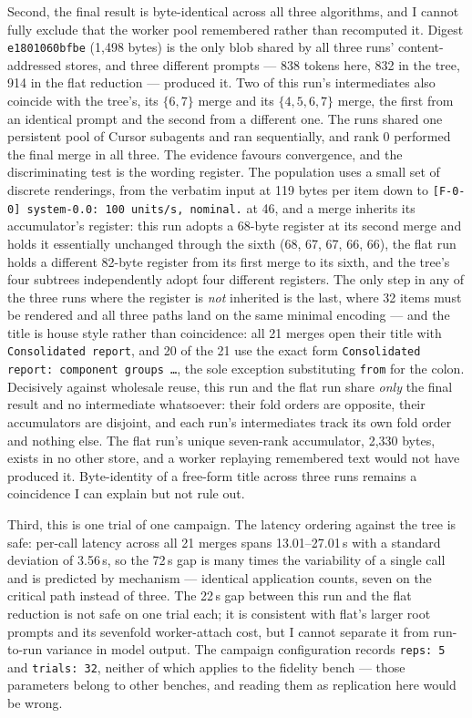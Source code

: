 \documentclass[11pt]{article}
\begin{document}
Second, the final result is byte-identical across all three algorithms, and I cannot
fully exclude that the worker pool remembered rather than recomputed it. Digest
\texttt{e1801060bfbe} (1{,}498 bytes) is the only blob shared by all three runs'
content-addressed stores, and three different prompts --- 838 tokens here, 832 in the
tree, 914 in the flat reduction --- produced it. Two of this run's intermediates also
coincide with the tree's, its $\{6,7\}$ merge and its $\{4,5,6,7\}$ merge, the first
from an identical prompt and the second from a different one. The runs shared one
persistent pool of Cursor subagents and ran sequentially, and rank 0 performed the final
merge in all three. The evidence favours convergence, and the discriminating test is the
wording register. The population uses a small set of discrete renderings, from the
verbatim input at 119 bytes per item down to \texttt{[F-0-0] system-0.0: 100 units/s,
nominal.} at 46, and a merge inherits its accumulator's register: this run adopts a
68-byte register at its second merge and holds it essentially unchanged through the
sixth (68, 67, 67, 66, 66), the flat run holds a different 82-byte register from its
first merge to its sixth, and the tree's four subtrees independently adopt four
different registers. The only step in any of the three runs where the register is
\emph{not} inherited is the last, where 32 items must be rendered and all three paths
land on the same minimal encoding --- and the title is house style rather than
coincidence: all 21 merges open their title with \texttt{Consolidated report}, and 20 of
the 21 use the exact form \texttt{Consolidated report: component groups \dots}, the sole
exception substituting \texttt{from} for the colon. Decisively against wholesale reuse,
this run and the flat run share \emph{only} the final result and no intermediate
whatsoever: their fold orders are opposite, their accumulators are disjoint, and each
run's intermediates track its own fold order and nothing else. The flat run's unique
seven-rank accumulator, 2{,}330 bytes, exists in no other store, and a worker replaying
remembered text would not have produced it. Byte-identity of a free-form title across
three runs remains a coincidence I can explain but not rule out.

Third, this is one trial of one campaign. The latency ordering against the tree is safe:
per-call latency across all 21 merges spans 13.01--27.01\,s with a standard deviation of
3.56\,s, so the 72\,s gap is many times the variability of a single call and is
predicted by mechanism --- identical application counts, seven on the critical path
instead of three. The 22\,s gap between this run and the flat reduction is not safe on
one trial each; it is consistent with flat's larger root prompts and its sevenfold
worker-attach cost, but I cannot separate it from run-to-run variance in model output.
The campaign configuration records \texttt{reps: 5} and \texttt{trials: 32}, neither of
which applies to the fidelity bench --- those parameters belong to other benches, and
reading them as replication here would be wrong.
\end{document}
